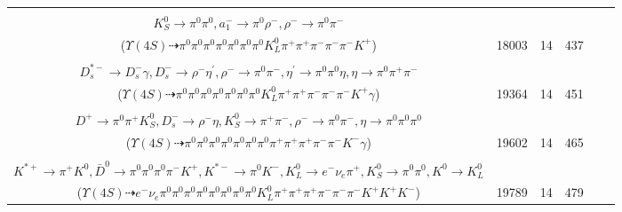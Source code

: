 \documentclass[landscape]{article}
\newcounter{rownumbers}
\newcommand\rn{\stepcounter{rownumbers}\arabic{rownumbers}}
\newcommand{\EOLP}{\\ \hline} %
\newcommand{\topoTags}[1]{#1} %
\begin{document}
\begin{longtable}{clcccc}
\rn & \makecell[l]{ $ 
\Upsilon(4S) \rightarrow B^{0} \bar{B}^{0} ,
B^{0} \rightarrow \pi^{0} \pi^{+} \rho^{-} \bar{K}^{0} K^{+} D^{-} ,
\bar{B}^{0} \rightarrow \pi^{0} \pi^{+} \pi^{-} ,
\rho^{-} \rightarrow \pi^{0} \pi^{-} ,
\bar{K}^{0} \rightarrow K_{L}^{0} ,
D^{-} \rightarrow K_{S}^{0} a_{1}^{-} ,
$ \\ $
K_{S}^{0} \rightarrow \pi^{0} \pi^{0} ,
a_{1}^{-} \rightarrow \pi^{0} \rho^{-} ,
\rho^{-} \rightarrow \pi^{0} \pi^{-} 
$ \\ ($
\Upsilon(4S) \dashrightarrow \pi^{0} \pi^{0} \pi^{0} \pi^{0} \pi^{0} \pi^{0} \pi^{0} K_{L}^{0} \pi^{+} \pi^{+} \pi^{-} \pi^{-} \pi^{-} K^{+} 
$) } & \topoTags{18003 & }14 & 437 \EOLP

\rn & \makecell[l]{ $ 
\Upsilon(4S) \rightarrow B^{0} \bar{B}^{0} ,
B^{0} \rightarrow \rho^{-} K_{0}^{*+} ,
\bar{B}^{0} \rightarrow D^{+} D_{s}^{*-} ,
\rho^{-} \rightarrow \pi^{0} \pi^{-} ,
K_{0}^{*+} \rightarrow \pi^{0} K^{+} ,
D^{+} \rightarrow \pi^{0} K_{L}^{0} \pi^{+} ,
$ \\ $
D_{s}^{*-} \rightarrow D_{s}^{-} \gamma ,
D_{s}^{-} \rightarrow \rho^{-} \eta^{\prime} ,
\rho^{-} \rightarrow \pi^{0} \pi^{-} ,
\eta^{\prime} \rightarrow \pi^{0} \pi^{0} \eta ,
\eta \rightarrow \pi^{0} \pi^{+} \pi^{-} 
$ \\ ($
\Upsilon(4S) \dashrightarrow \pi^{0} \pi^{0} \pi^{0} \pi^{0} \pi^{0} \pi^{0} \pi^{0} K_{L}^{0} \pi^{+} \pi^{+} \pi^{-} \pi^{-} \pi^{-} K^{+} \gamma 
$) } & \topoTags{19364 & }14 & 451 \EOLP

\rn & \makecell[l]{ $ 
\Upsilon(4S) \rightarrow \bar{B}^{0} \bar{B}^{0} ,
\bar{B}^{0} \rightarrow \pi^{+} K_{0}^{*-} ,
\bar{B}^{0} \rightarrow D_{2}^{*+} D_{s}^{*-} ,
K_{0}^{*-} \rightarrow \pi^{0} K^{-} ,
D_{2}^{*+} \rightarrow \pi^{0} D^{+} ,
D_{s}^{*-} \rightarrow D_{s}^{-} \gamma ,
$ \\ $
D^{+} \rightarrow \pi^{0} \pi^{+} K_{S}^{0} ,
D_{s}^{-} \rightarrow \rho^{-} \eta ,
K_{S}^{0} \rightarrow \pi^{+} \pi^{-} ,
\rho^{-} \rightarrow \pi^{0} \pi^{-} ,
\eta \rightarrow \pi^{0} \pi^{0} \pi^{0} 
$ \\ ($
\Upsilon(4S) \dashrightarrow \pi^{0} \pi^{0} \pi^{0} \pi^{0} \pi^{0} \pi^{0} \pi^{0} \pi^{+} \pi^{+} \pi^{+} \pi^{-} \pi^{-} K^{-} \gamma 
$) } & \topoTags{19602 & }14 & 465 \EOLP

\rn & \makecell[l]{ $ 
\Upsilon(4S) \rightarrow B^{0} \bar{B}^{0} ,
B^{0} \rightarrow \pi^{0} \pi^{+} \pi^{-} \rho^{-} K^{0} \bar{K}^{0} K^{*+} \bar{D}^{0} ,
\bar{B}^{0} \rightarrow K^{+} K^{*-} ,
\rho^{-} \rightarrow \pi^{0} \pi^{-} ,
K^{0} \rightarrow K_{L}^{0} ,
\bar{K}^{0} \rightarrow K_{S}^{0} ,
$ \\ $
K^{*+} \rightarrow \pi^{+} K^{0} ,
\bar{D}^{0} \rightarrow \pi^{0} \pi^{0} \pi^{0} \pi^{-} K^{+} ,
K^{*-} \rightarrow \pi^{0} K^{-} ,
K_{L}^{0} \rightarrow e^{-} \nu_{e} \pi^{+} ,
K_{S}^{0} \rightarrow \pi^{0} \pi^{0} ,
K^{0} \rightarrow K_{L}^{0} 
$ \\ ($
\Upsilon(4S) \dashrightarrow e^{-} \nu_{e} \pi^{0} \pi^{0} \pi^{0} \pi^{0} \pi^{0} \pi^{0} \pi^{0} \pi^{0} K_{L}^{0} \pi^{+} \pi^{+} \pi^{+} \pi^{-} \pi^{-} \pi^{-} K^{+} K^{+} K^{-} 
$) } & \topoTags{19789 & }14 & 479 \EOLP


\end{longtable}
\end{document}
